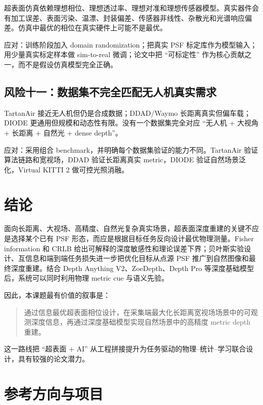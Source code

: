 \documentclass[11pt,a4paper,fontset=none]{ctexart}
\begin{document}
超表面仿真依赖理想相位、理想透过率、理想对准和理想传感器模型。真实器件会有加工误差、表面污染、温漂、封装偏差、传感器非线性、杂散光和光谱响应偏差。仿真中最优的相位在真实硬件上可能不是最优。

应对：训练阶段加入 domain randomization；把真实 PSF 标定库作为模型输入；用少量真实标定样本做 sim-to-real 微调；论文中把 ``可标定性'' 作为核心贡献之一，而不是假设仿真模型完全正确。

\subsection{风险十一：数据集不完全匹配无人机真实需求}

TartanAir 接近无人机但仍是合成数据；DDAD/Waymo 长距离真实但偏车载；DIODE 更通用但规模和动态性有限。没有一个数据集完全对应 ``无人机 + 大视角 + 长距离 + 自然光 + dense depth''。

应对：采用组合 benchmark，并明确每个数据集验证的能力不同。TartanAir 验证算法链路和宽视场，DDAD 验证长距离真实 metric，DIODE 验证自然场景泛化，Virtual KITTI 2 做可控光照消融。

\section{结论}

面向长距离、大视场、高精度、自然光复杂真实场景，超表面深度重建的关键不应是选择某个已有 PSF 形态，而应是根据目标任务反向设计最优物理测量。Fisher information 和 CRLB 给出可解释的深度敏感性和理论误差下界；贝叶斯实验设计、互信息和端到端任务损失进一步把优化目标从点源 PSF 推广到自然图像和最终深度重建。结合 Depth Anything V2、ZoeDepth、Depth Pro 等深度基础模型后，系统可以同时利用物理 metric cue 与语义先验。

因此，本课题最有价值的叙事是：
\begin{quote}
通过信息最优超表面相位设计，在采集端最大化长距离宽视场场景中的可观测深度信息，再通过深度基础模型实现自然场景中的高精度 metric depth 重建。
\end{quote}

这一路线把 ``超表面 + AI'' 从工程拼接提升为任务驱动的物理--统计--学习联合设计，具有较强的论文潜力。

\section*{参考方向与项目}
\end{document}
